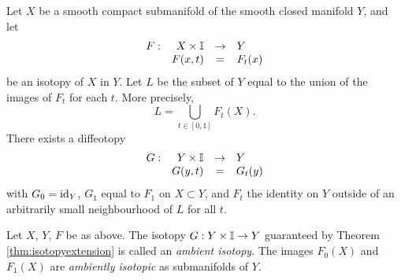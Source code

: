 \begin{theorem}
	\label{thm:isotopyextension}
	Let $X$ be a smooth compact submanifold of the smooth closed manifold $Y$, and let
	\[
		\begin{array}{crcl}
			F: & X\times\mathbb{I} & \to & Y \\
			   & F(x,t) & = & F_t(x)
		\end{array}
	\]
	be an isotopy of $X$ in $Y$.
	Let $L$ be the subset of $Y$ equal to the union of the images of $F_t$ for each $t$.
	More precisely,
	\[
		L = \bigcup_{t\in[0,1]} F_t(X).
	\]
	There exists a diffeotopy 
	\[
		\begin{array}{crcl}
			G: & Y\times\mathbb{I} & \to & Y \\
			   & G(y,t) & = & G_t(y)				
		\end{array}
	\]
	with $G_0=\textrm{id}_{Y}$, $G_1$ equal to $F_1$ on $X\subset Y$, and $F_t$ the identity on $Y$ outside of an arbitrarily small neighbourhood of $L$ for all $t$.
\end{theorem}

\begin{defn}
	\label{def:ambientisotopy}
	Let $X$, $Y$, $F$ be as above.
	The isotopy $G:Y\times\mathbb{I}\to Y$ guaranteed by Theorem \ref{thm:isotopyextension} is called an \emph{ambient isotopy}.
	The images $F_0(X)$ and $F_1(X)$ are \emph{ambiently isotopic} as submanifolds of $Y$.
\end{defn}
